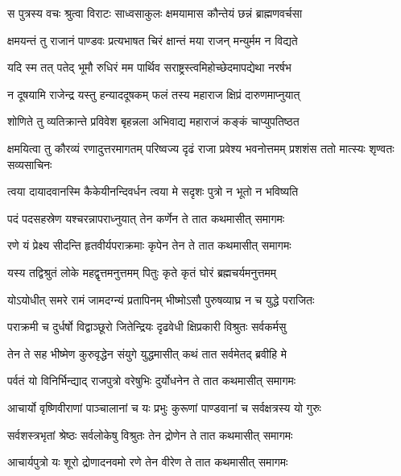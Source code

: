 \twolineshloka
{स पुत्रस्य वचः श्रुत्वा विराटः साध्वसाकुलः}
{क्षमयामास कौन्तेयं छन्नं ब्राह्मणवर्चसा}


\twolineshloka
{क्षमयन्तं तु राजानं पाण्डवः प्रत्यभाषत}
{चिरं क्षान्तं मया राजन् मन्युर्मम न विद्यते}


\twolineshloka
{यदि स्म तत् पतेद् भूमौ रुधिरं मम पार्थिव}
{सराष्ट्रस्त्वमिहोच्छेदमापद्येथा नरर्षभ}


\twolineshloka
{न दूषयामि राजेन्द्र यस्तु हन्याददूषकम्}
{फलं तस्य महाराज क्षिप्रं दारुणमाप्नुयात्}



\twolineshloka
{शोणिते तु व्यतिक्रान्ते प्रविवेश बृहन्नला}
{अभिवाद्य महाराजं कङ्कं चाप्युपतिष्ठत}


\threelineshloka
{क्षमयित्वा तु कौरव्यं रणादुत्तरमागतम्}
{परिष्वज्य दृढं राजा प्रवेश्य भवनोत्तमम्}
{प्रशशंस ततो मात्स्यः शृण्वतः सव्यसाचिनः}




\twolineshloka
{त्वया दायादवानस्मि कैकेयीनन्दिवर्धन}
{त्वया मे सदृशः पुत्रो न भूतो न भविष्यति}


\twolineshloka
{पदं पदसहस्रेण यश्चरन्नापराध्नुयात्}
{तेन कर्णेन ते तात कथमासीत् समागमः}


\twolineshloka
{रणे यं प्रेक्ष्य सीदन्ति हृतवीर्यपराक्रमाः}
{कृपेन तेन ते तात कथमासीत् समागमः}


\twolineshloka
{यस्य तद्विश्रुतं लोके महद्वृत्तमनुत्तमम्}
{पितुः कृते कृतं घोरं ब्रह्मचर्यमनुत्तमम्}


\twolineshloka
{योऽयोधीत् समरे रामं जामदग्न्यं प्रतापिनम्}
{भीष्मोऽसौ पुरुषव्याघ्र न च युद्धे पराजितः}


\twolineshloka
{पराक्रमी च दुर्धर्षो विद्वाञ्छूरो जितेन्द्रियः}
{दृढवेधी क्षिप्रकारी विश्रुतः सर्वकर्मसु}


\twolineshloka
{तेन ते सह भीष्मेण कुरुवृद्धेन संयुगे}
{युद्धमासीत् कथं तात सर्वमेतद् ब्रवीहि मे}


\twolineshloka
{पर्वतं यो विनिर्भिन्द्याद् राजपुत्रो वरेषुभिः}
{दुर्योधनेन ते तात कथमासीत् समागमः}


\twolineshloka
{आचार्यो वृष्णिवीराणां पाञ्चालानां च यः प्रभुः}
{कुरूणां पाण्डवानां च सर्वक्षत्रस्य यो गुरुः}


\twolineshloka
{सर्वशस्त्रभृतां श्रेष्ठः सर्वलोकेषु विश्रुतः}
{तेन द्रोणेन ते तात कथमासीत् समागमः}


\twolineshloka
{आचार्यपुत्रो यः शूरो द्रोणादनवमो रणे}
{तेन वीरेण ते तात कथमासीत् समागमः}


